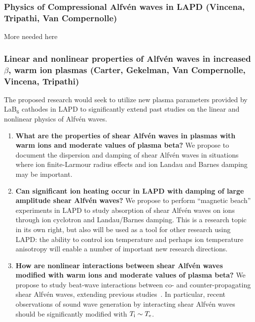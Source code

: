 \documentclass[11pt]{article}
\newcommand\Alfven{Alfv\'en }
\renewcommand{\cite}{\citep}
\begin{document}
\subsubsection{Physics of Compressional \Alfven waves in LAPD (Vincena, Tripathi,
Van Compernolle)}

More needed here


\subsubsection{Linear and nonlinear properties of Alfv\'{e}n waves in
  increased $\beta$, warm ion plasmas (Carter, Gekelman, Van
  Compernolle, Vincena, Tripathi)}

The proposed research would seek to utilize new plasma parameters
provided by LaB$_6$ cathodes in LAPD to significantly extend past
studies on the linear and nonlinear physics of Alfv\'{e}n waves.


\begin{enumerate}
\item {\bfseries What are the properties of shear Alfv\'{e}n waves in
  plasmas with warm ions and moderate values of plasma beta?}  We
  propose to document the dispersion and damping of shear Alfv\'{e}n
  waves in situations where ion finite-Larmour radius effects and ion
  Landau and Barnes damping may be important.

\item {\bfseries Can significant ion heating occur in LAPD with
  damping of large amplitude shear Alfv\'{e}n waves?} We propose to
  perform ``magnetic beach'' experiments in LAPD to study absorption
  of shear Alfv\'{e}n waves on ions through ion cyclotron and
  Landau/Barnes damping.  This is a research topic in its own right,
  but also will be used as a tool for other research using
  LAPD:  the ability to control ion temperature and perhaps ion
  temperature anisotropy will enable a number of important new
  research directions. 

\item {\bfseries How are nonlinear interactions between shear
  Alfv\'{e}n waves modified with warm ions and moderate values of
  plasma beta?} We propose to study beat-wave interactions between co-
  and counter-propagating shear Alfv\'{e}n waves, extending previous
  studies~\cite{}.  In particular, recent observations of sound wave
  generation by interacting shear Alfv\'{e}n waves should be
  significantly modified with $T_{\rm i} \sim T_{\rm e}$.

\end{enumerate}
\end{document}
